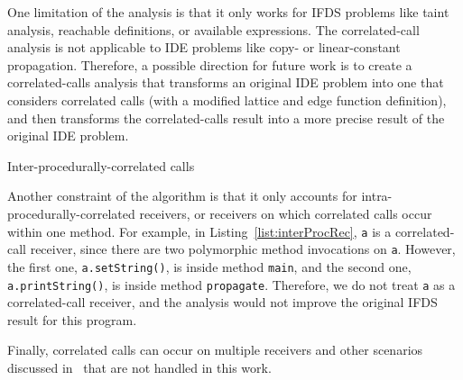 One limitation of the analysis is that it only works for IFDS problems like taint analysis, reachable definitions, or available expressions. The correlated-call analysis is not applicable to IDE problems like copy- or linear-constant propagation. Therefore, a possible direction for future work is to create a correlated-calls analysis that transforms an original IDE problem into one that considers correlated calls (with a modified lattice and edge function definition), and then transforms the correlated-calls result into a more precise result of the original IDE problem.

\begin{listing}
  \caption{Inter-procedurally-correlated calls}
  \label{list:interProcRec}
\end{listing}

Another constraint of the algorithm is that it only accounts for intra-procedurally-correlated receivers, or receivers on which correlated calls occur within one method. For example, in Listing~\ref{list:interProcRec}, \verb'a' is a correlated-call receiver, since there are two polymorphic method invocations on \verb'a'. However, the first one, \verb'a.setString()', is inside method \verb'main', and the second one, \verb'a.printString()', is inside method \verb'propagate'. Therefore, we do not treat \verb'a' as a correlated-call receiver, and the analysis would not improve the original IFDS result for this program.

Finally, correlated calls can occur on multiple receivers and other scenarios discussed in~\cite{frank2014correlated} that are not handled in this work.
